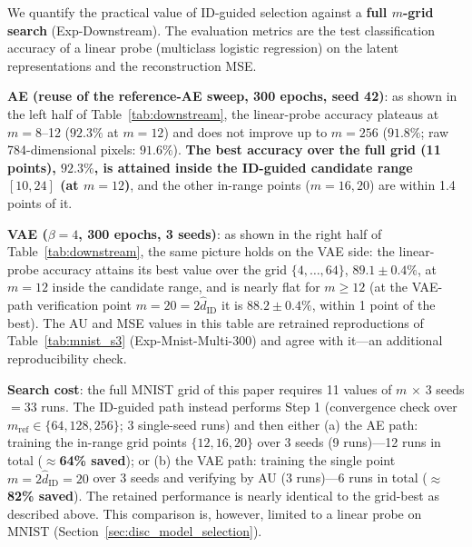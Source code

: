 \documentclass[make,article,submit,pdftex,moreauthors]{Definitions/mdpi}
\newcommand{\hatdID}{\hat{d}_{\mathrm{ID}}}
\begin{document}
We quantify the practical value of ID-guided selection against a
\textbf{full $m$-grid search} (Exp-Downstream).
The evaluation metrics are the test classification accuracy of a linear
probe (multiclass logistic regression) on the latent representations and the
reconstruction MSE.

\textbf{AE (reuse of the reference-AE sweep, 300 epochs, seed 42)}:
as shown in the left half of Table~\ref{tab:downstream},
the linear-probe accuracy plateaus at $m = 8$--12 ($92.3\%$ at $m = 12$)
and does not improve up to $m = 256$ ($91.8\%$; raw 784-dimensional pixels:
$91.6\%$).
\textbf{The best accuracy over the full grid (11 points), $92.3\%$, is
attained inside the ID-guided candidate range $[10, 24]$ (at $m = 12$)},
and the other in-range points ($m = 16, 20$) are within 1.4 points of it.

\textbf{VAE ($\beta = 4$, 300 epochs, 3 seeds)}:
as shown in the right half of Table~\ref{tab:downstream}, the same picture
holds on the VAE side: the linear-probe accuracy attains its best value over
the grid $\{4, \ldots, 64\}$, $89.1 \pm 0.4\%$, at $m = 12$ inside the
candidate range, and is nearly flat for $m \geq 12$
(at the VAE-path verification point $m = 20 = 2\hatdID$ it is
$88.2 \pm 0.4\%$, within 1 point of the best).
The AU and MSE values in this table are retrained reproductions of
Table~\ref{tab:mnist_s3} (Exp-Mnist-Multi-300) and agree with it---an
additional reproducibility check.

\textbf{Search cost}: the full MNIST grid of this paper requires 11 values
of $m$ $\times$ 3 seeds $= 33$ runs.
The ID-guided path instead performs Step 1 (convergence check over
$m_{\mathrm{ref}} \in \{64, 128, 256\}$; 3 single-seed runs) and then either
(a) the AE path: training the in-range grid points $\{12, 16, 20\}$ over 3
seeds (9 runs)---12 runs in total (\textbf{$\approx$64\% saved}); or
(b) the VAE path: training the single point $m = 2\hatdID = 20$ over 3 seeds
and verifying by AU (3 runs)---6 runs in total
(\textbf{$\approx$82\% saved}).
The retained performance is nearly identical to the grid-best as described
above.
This comparison is, however, limited to a linear probe on MNIST
(Section~\ref{sec:disc_model_selection}).
\end{document}
